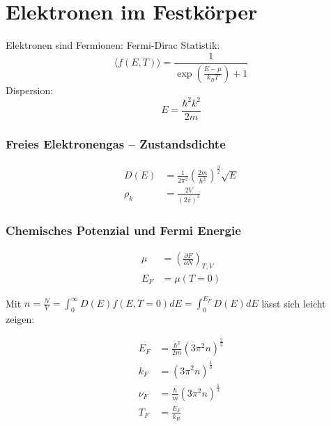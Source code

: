 \section{Elektronen im Festkörper}

Elektronen sind Fermionen: Fermi-Dirac Statistik:
\begin{equation*}
    \langle f(E,T) \rangle = \frac{1}{\exp \left(\frac{E-\mu}{k_B T}\right)+1}
\end{equation*}
Dispersion:
\begin{equation*}
    E = \frac{\hbar^2 k^2}{2m}
\end{equation*}


\subsubsection*{Freies Elektronengas – Zustandsdichte}

\begin{equation*}
    \begin{aligned}
        D(E) &= \frac{1}{2 \pi^2} \left(\frac{2m}{\hbar^2}\right)^{\frac{3}{2}} \sqrt{E} \\
        \rho_k &= \frac{2V}{(2 \pi)^3}
    \end{aligned}
\end{equation*}


\subsubsection*{Chemisches Potenzial und Fermi Energie}
\begin{equation*}
    \begin{aligned}
        \mu &= \left(\frac{\partial F}{\partial N}\right)_{T,V} \\
        E_F &= \mu (T=0)
    \end{aligned}
\end{equation*}

Mit $n=\frac{N}{V} = \int_0^\infty D(E)f(E,T=0)dE =\int_0^{E_F} D(E)dE$ lässt sich leicht zeigen:

\begin{equation*}
    \begin{aligned}
        E_F &= \frac{\hbar^2}{2m} \left(3 \pi^2 n\right)^{\frac{2}{3}} \\
        k_F &= \left(3 \pi^2 n\right)^{\frac{1}{3}} \\
        \nu_F &= \frac{\hbar}{m} \left(3 \pi^2 n\right)^{\frac{1}{3}} \\
        T_F &= \frac{E_F}{k_B}
    \end{aligned}
\end{equation*}

